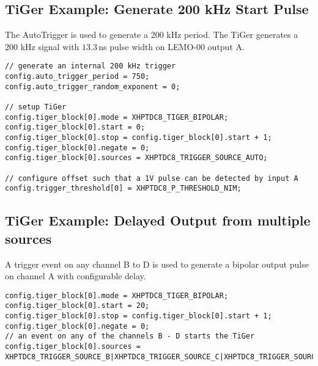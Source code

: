 \newpage
\subsection{TiGer Example: Generate 200 kHz Start Pulse}
The AutoTrigger is used to generate a 200 kHz period. 
The TiGer generates a 200 kHz signal with $13.3$\,ns pulse width on LEMO-00
output A.

\begin{lstlisting}
// generate an internal 200 kHz trigger
config.auto_trigger_period = 750;
config.auto_trigger_random_exponent = 0;

// setup TiGer 
config.tiger_block[0].mode = XHPTDC8_TIGER_BIPOLAR;
config.tiger_block[0].start = 0;
config.tiger_block[0].stop = config.tiger_block[0].start + 1;
config.tiger_block[0].negate = 0;
config.tiger_block[0].sources = XHPTDC8_TRIGGER_SOURCE_AUTO;

// configure offset such that a 1V pulse can be detected by input A 
config.trigger_threshold[0] = XHPTDC8_P_THRESHOLD_NIM;
\end{lstlisting}

\subsection{TiGer Example: Delayed Output from multiple sources}
A trigger event on any channel B to D is used to generate a bipolar output
pulse on channel A with configurable delay. 
\begin{lstlisting}
config.tiger_block[0].mode = XHPTDC8_TIGER_BIPOLAR;
config.tiger_block[0].start = 20;
config.tiger_block[0].stop = config.tiger_block[0].start + 1;
config.tiger_block[0].negate = 0;
// an event on any of the channels B - D starts the TiGer 
config.tiger_block[0].sources = XHPTDC8_TRIGGER_SOURCE_B|XHPTDC8_TRIGGER_SOURCE_C|XHPTDC8_TRIGGER_SOURCE_D;
\end{lstlisting}
